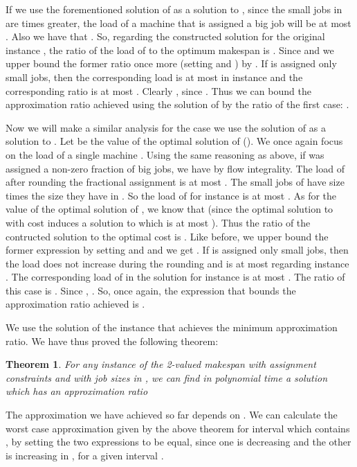 \documentclass[11pt]{article}\usepackage{amsmath}
\newtheorem{theorem}{Theorem}[section]
\begin{document}
If we use the forementioned solution of  as a solution to , since the small
jobs in  are  times greater, the load of a machine  that is assigned a big job 
will be  at most
.  Also we have that . So, regarding the constructed solution for the original instance , the ratio of the load of  to the optimum makespan is . Since  and  we upper bound the former ratio once more (setting  and ) by  . If  is assigned only small jobs, then the corresponding load is at most  in instance  and the corresponding ratio is at most . Clearly , since . Thus we can bound the approximation ratio achieved using the solution of  by the ratio of the first case: .


Now we will make a similar analysis for the case we use the solution
of  as a solution to . Let  be the value of the optimal
solution of  (). We once again focus on the load of a
single machine . Using the same reasoning as above, if  was assigned a non-zero fraction  of  big jobs, we have  by flow integrality. The load of 
after rounding the fractional assignment is at most . The
small jobs of  have size  times the size they have in
. So the load of  for instance  is at most
. As for the value   of the optimal solution of , we know that  (since the optimal solution to  with cost  induces a solution to  which is at most  ). Thus the ratio of the contructed solution to the optimal cost is . Like before, we upper bound the former expression by setting  and  and we get . If  is assigned only small jobs, then the load does not increase during the rounding and is at most  regarding instance . The corresponding load of  in the solution for instance  is at most . The ratio of this case is . Since , . So, once again, the expression that bounds the approximation ratio achieved is .

We use the solution of the instance that achieves the minimum approximation ratio. We have thus proved the following theorem:

\begin{theorem}
For any instance of the 2-valued makespan with assignment constraints
and with job sizes in ,  we can find in polynomial time a solution which has an approximation ratio 
\end{theorem}

The approximation we have achieved so far depends on . We can calculate  
 the worst case approximation given by the above theorem for interval  which contains , by setting the two expressions to be equal, since one is decreasing  and the other is increasing in , for a given interval .
\end{document}
